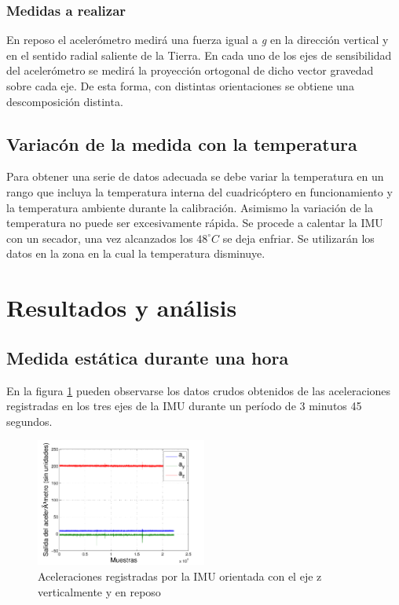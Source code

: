 \documentclass[main]{subfiles}
\begin{document}
\subsubsection*{Medidas a realizar}
En reposo el acelerómetro medirá una fuerza igual a \textit{g} en la dirección vertical y en el sentido radial saliente de la Tierra. En cada uno de los ejes de sensibilidad del acelerómetro se medirá la proyección ortogonal de dicho vector gravedad sobre cada eje. De esta forma, con distintas orientaciones se obtiene una descomposición distinta.

\subsection{Variac\'on de la medida con la temperatura}
Para obtener una serie de datos adecuada se debe variar la temperatura en un rango que incluya la temperatura interna del cuadric\'optero en funcionamiento y la temperatura ambiente durante la calibraci\'on. Asimismo la variaci\'on de la temperatura no puede ser excesivamente r\'apida. Se procede a calentar la IMU con un secador, una vez alcanzados los $48^\circ C$ se deja enfriar. Se utilizar\'an los datos en la zona en la cual la temperatura disminuye. 

\section{Resultados y análisis}
\subsection{Medida estática durante una hora}

En la figura \ref{fig:rrtests} pueden observarse los datos crudos obtenidos de las aceleraciones registradas en los tres ejes de la IMU durante un período de 3 minutos 45 segundos.

\begin{figure}[h!]
  \begin{center}
    \includegraphics[width=0.5\textwidth]{./pics_acc/rrtests.pdf}
  \end{center}
  \caption{Aceleraciones registradas por la IMU orientada con el eje z verticalmente y en reposo}
  \label{fig:rrtests}

\end{figure}
\end{document}
